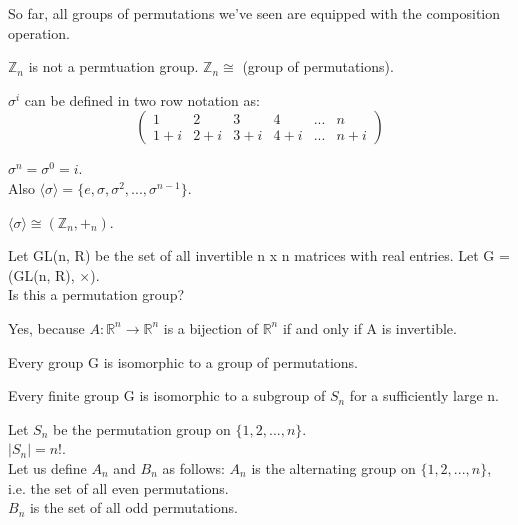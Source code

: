 
\begin{note}
    So far, all groups of permutations we've seen are equipped with the composition operation. 
\end{note}

\begin{eg}
   $ \mathbb{Z}_n$ is not a permtuation group. $\mathbb{Z}_n \cong$ (group of permutations).
\end{eg}

\begin{eg}
 $\sigma^i$ can be defined in two row notation as: 
    \[
        \begin{pmatrix}
            1 & 2 & 3 & 4 & ... & n \\
            1+i & 2+i & 3+i & 4+i & ... & n+i
        \end{pmatrix}
    \]

    $\sigma^n = \sigma^0 = i$.\\

    Also $\langle \sigma \rangle = \{e, \sigma, \sigma^2, ..., \sigma^{n-1}\}$.\\
\end{eg}
\begin{remark}
$\langle \sigma \rangle \cong (\mathbb{Z}_n, +_n)$.
\end{remark}

\begin{exercise}
Let GL(n, R) be the set of all invertible n x n matrices with real entries. Let G = (GL(n, R), $\times$).\\
Is this a permutation group?\\
\end{exercise}
\begin{answer}
Yes, because $A: \mathbb{R}^n \to \mathbb{R}^n$ is a bijection of $\mathbb{R}^n$ if and only if A is invertible.\\
\end{answer}

\begin{theorem}
    Every group G is isomorphic to a group of permutations.
\end{theorem}

\begin{corollary}
    Every finite group G is isomorphic to a subgroup of $S_n$ for a sufficiently large n.
\end{corollary}

\begin{definition}[Properties of $S_n$]
   Let $S_n$ be the permutation group on $\{1, 2, ..., n\}$.\\
   $|S_n| = n!$.\\
   Let us define $A_n$ and $B_n$ as follows:
   $A_n$ is the alternating group on $\{1, 2, ..., n\}$, i.e. the set of all even permutations.\\ 
   $B_n$ is the set of all odd permutations.\\
\end{definition}

